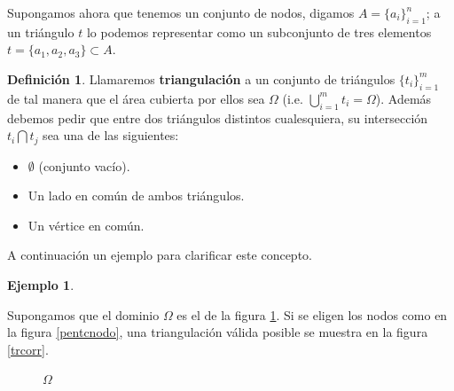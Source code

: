\documentclass[12pt,spanish,oneside]{book}
\theoremstyle{plain}
\numberwithin{equation}{chapter}
\theoremstyle{definition}
\newtheorem{defi}{Definici\'{o}n}[chapter]
\newtheorem{ej}{Ejemplo}[chapter]
\theoremstyle{remark}
\begin{document}
Supongamos ahora que tenemos un conjunto de nodos, digamos $A=\lbrace a_i\rbrace_{i=1}^n$; a un triángulo $t$ lo podemos representar como un subconjunto de tres elementos $t=\lbrace a_1,a_2,a_3\rbrace \subset A$.
\begin{defi}

Llamaremos \textbf{triangulación} a un conjunto de triángulos $\lbrace t_i\rbrace_{i=1}^m$ de tal manera que el área cubierta por ellos sea $\Omega$ (i.e. $\bigcup_{i=1}^m t_i=\Omega$). Además debemos pedir que entre dos triángulos distintos cualesquiera, su intersección $t_i \bigcap t_j$ sea una de las siguientes: 

\begin{itemize}
\item $\emptyset$ (conjunto vacío).
\item Un lado en común de ambos triángulos.
\item Un vértice en común.
\end{itemize}
\end{defi}

A continuación un ejemplo para clarificar este concepto.

\begin{ej}
\end{ej}
Supongamos que el dominio $\Omega$ es el de la figura \ref{pentagono}. Si se eligen los nodos como en la figura \ref{pentcnodo}, una triangulación válida posible se muestra en la figura \ref{trcorr}.
\begin{figure}[H]
\centering 
{}
\caption{$\Omega$}
\label{pentagono}
\end{figure}
\end{document}
